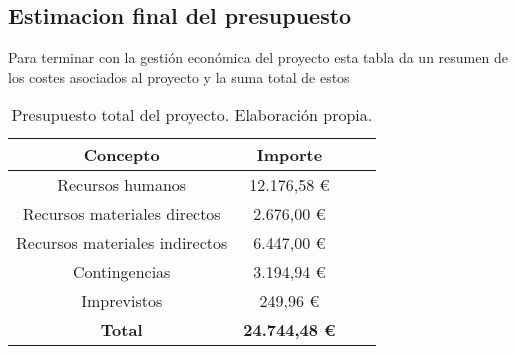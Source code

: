 \subsection{Estimacion final del presupuesto}

Para terminar con la gestión económica del proyecto esta tabla da un resumen de los costes asociados al proyecto y la
suma total de estos

\begin{table}[H]
    \begin{center}
    \begin{tabular}{|c|c|c|c|}
        \hline
        \textbf{Concepto} & \textbf{Importe}\\ 
        \hline
        Recursos humanos & 12.176,58 € \\
        Recursos materiales directos & 2.676,00 € \\
        Recursos materiales indirectos  & 6.447,00 € \\
        Contingencias & 3.194,94 € \\
        Imprevistos & 249,96 € \\
        \hline
        \textbf{Total} & \textbf{24.744,48 €} \\
        \hline
    \end{tabular}
    \caption{Presupuesto total del proyecto. Elaboración propia.}
    \label{tab:presupuesto_total}
    \end{center}
\end{table}
